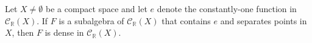 Let $X \neq \emptyset$ be a compact space and let $e$ denote the constantly-one function in $\mathcal{C}_{\mathbb{R}}(X)$. If $F$ is a subalgebra of $\mathcal{C}_{\mathbb{R}}(X)$ that contains $e$ and separates points in $X$, then $F$ is dense in $\mathcal{C}_{\mathbb{R}}(X)$.
